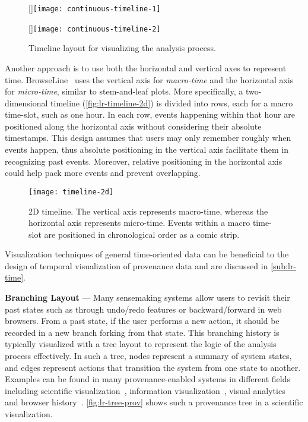 \begin{figure}[!htb]
\centering
{}[\columnwidth]{\texttt{[image: continuous-timeline-1]}}

\vspace{.5\baselineskip}

[\columnwidth]{\texttt{[image: continuous-timeline-2]}}
\caption{Timeline layout for visualizing the analysis process.}
\end{figure}

Another approach is to use both the horizontal and vertical axes to represent time. BrowseLine~\cite{Hoeber2009} uses the vertical axis for \emph{macro-time} and the horizontal axis for \emph{micro-time}, similar to stem-and-leaf plots. More specifically, a two-dimensional timeline (\autoref{fig:lr-timeline-2d}) is divided into rows, each for a macro time-slot, such as one hour. In each row, events happening within that hour are positioned along the horizontal axis without considering their absolute timestamps. This design assumes that users may only remember roughly when events happen, thus absolute positioning in the vertical axis facilitate them in recognizing past events. Moreover, relative positioning in the horizontal axis could help pack more events and prevent overlapping. 

\begin{figure}[!htb]
	\centering
	\texttt{[image: timeline-2d]}
	\caption[Two-dimensional timeline]{2D timeline. The vertical axis represents macro-time, whereas the horizontal axis represents micro-time. Events within a macro time-slot are positioned in chronological order as a comic strip. }
	\label{fig:lr-timeline-2d}
\end{figure}

Visualization techniques of general time-oriented data can be beneficial to the design of temporal visualization of provenance data and are discussed in \autoref{sub:lr-time}.

\textbf{Branching Layout} --- Many sensemaking systems allow users to revisit their past states such as through undo/redo features or backward/forward in web browsers. From a past state, if the user performs a new action, it should be recorded in a new branch forking from that state. This branching history is typically visualized with a tree layout to represent the logic of the analysis process effectively. In such a tree, nodes represent a summary of system states, and edges represent actions that transition the system from one state to another. Examples can be found in many provenance-enabled systems in different fields including scientific visualization~\cite{Ma1999}, information visualization~\cite{Dunne2012}, visual analytics~\cite{Kadivar2009} and browser history~\cite{Ayers1995}. \autoref{fig:lr-tree-prov} shows such a provenance tree in a scientific visualization.

